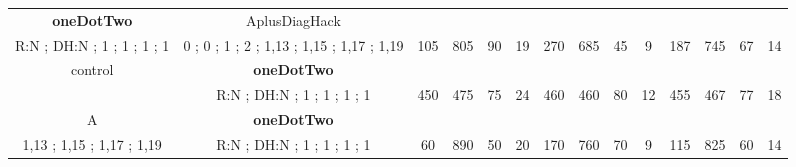 \begin{table}[H]
{\begin{tabular}{|c|c|c|c|c|c|c|c|c|c|c|c|c|c|}
\cellcolor{blue!15}\textbf{oneDotTwo} & AplusDiagHack& {\color[HTML]{00009B} } & {\color[HTML]{9A0000} } & {\color[HTML]{009901} } &  & {\color[HTML]{00009B} } & {\color[HTML]{9A0000} } & {\color[HTML]{009901} } &  & {\color[HTML]{00009B} } & {\color[HTML]{9A0000} } & {\color[HTML]{009901} } &  \\ 
\cellcolor{ blue!15}R:N ; DH:N ; 1 ; 1 ; 1 ; 1 & 0 ; 0 ; 1 ; 2 ; 1,13 ; 1,15 ; 1,17 ; 1,19 & \multirow{-2}{*}{{\color[HTML]{00009B} 105}} & \multirow{-2}{*}{{\color[HTML]{9A0000} 805}} & \multirow{-2}{*}{{\color[HTML]{009901} 90}} & \multirow{-2}{*}{19} & \multirow{-2}{*}{{\color[HTML]{00009B} 270}} & \multirow{-2}{*}{{\color[HTML]{9A0000} 685}} & \multirow{-2}{*}{{\color[HTML]{009901} 45}} & \multirow{-2}{*}{9} & \multirow{-2}{*}{{\color[HTML]{00009B} 187}} & \multirow{-2}{*}{{\color[HTML]{9A0000} 745}} & \multirow{-2}{*}{{\color[HTML]{009901} 67}} & \multirow{-2}{*}{14} \\ \hline

control & \cellcolor{blue!15}\textbf{oneDotTwo}& {\color[HTML]{00009B} } & {\color[HTML]{9A0000} } & {\color[HTML]{009901} } &  & {\color[HTML]{00009B} } & {\color[HTML]{9A0000} } & {\color[HTML]{009901} } &  & {\color[HTML]{00009B} } & {\color[HTML]{9A0000} } & {\color[HTML]{009901} } &  \\ 
 & \cellcolor{ blue!15}R:N ; DH:N ; 1 ; 1 ; 1 ; 1 & \multirow{-2}{*}{{\color[HTML]{00009B} 450}} & \multirow{-2}{*}{{\color[HTML]{9A0000} 475}} & \multirow{-2}{*}{{\color[HTML]{009901} 75}} & \multirow{-2}{*}{24} & \multirow{-2}{*}{{\color[HTML]{00009B} 460}} & \multirow{-2}{*}{{\color[HTML]{9A0000} 460}} & \multirow{-2}{*}{{\color[HTML]{009901} 80}} & \multirow{-2}{*}{12} & \multirow{-2}{*}{{\color[HTML]{00009B} 455}} & \multirow{-2}{*}{{\color[HTML]{9A0000} 467}} & \multirow{-2}{*}{{\color[HTML]{009901} 77}} & \multirow{-2}{*}{18} \\ \hline

A & \cellcolor{blue!15}\textbf{oneDotTwo}& {\color[HTML]{00009B} } & {\color[HTML]{9A0000} } & {\color[HTML]{009901} } &  & {\color[HTML]{00009B} } & {\color[HTML]{9A0000} } & {\color[HTML]{009901} } &  & {\color[HTML]{00009B} } & {\color[HTML]{9A0000} } & {\color[HTML]{009901} } &  \\ 
1,13 ; 1,15 ; 1,17 ; 1,19 & \cellcolor{ blue!15}R:N ; DH:N ; 1 ; 1 ; 1 ; 1 & \multirow{-2}{*}{{\color[HTML]{00009B} 60}} & \multirow{-2}{*}{{\color[HTML]{9A0000} 890}} & \multirow{-2}{*}{{\color[HTML]{009901} 50}} & \multirow{-2}{*}{20} & \multirow{-2}{*}{{\color[HTML]{00009B} 170}} & \multirow{-2}{*}{{\color[HTML]{9A0000} 760}} & \multirow{-2}{*}{{\color[HTML]{009901} 70}} & \multirow{-2}{*}{9} & \multirow{-2}{*}{{\color[HTML]{00009B} 115}} & \multirow{-2}{*}{{\color[HTML]{9A0000} 825}} & \multirow{-2}{*}{{\color[HTML]{009901} 60}} & \multirow{-2}{*}{14} \\ \hline


\end{tabular}}
\end{table}
